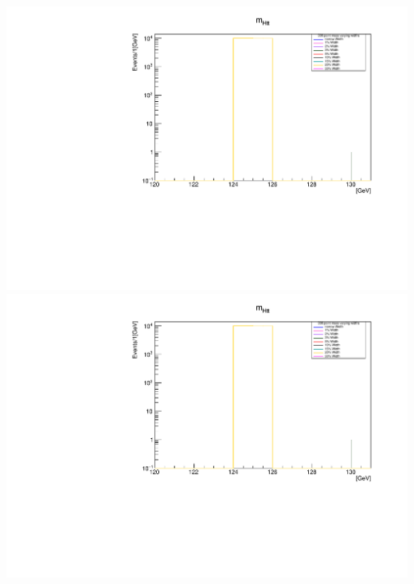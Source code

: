 \documentclass[a4wide,10pt]{article}
\begin{document}
\includegraphics[scale=0.50,page=13]{../Pdfs/Htautau_Mass_VaryingWidths.pdf}
\includegraphics[scale=0.50,page=14]{../Pdfs/Htautau_Mass_VaryingWidths.pdf}
\end{document}
